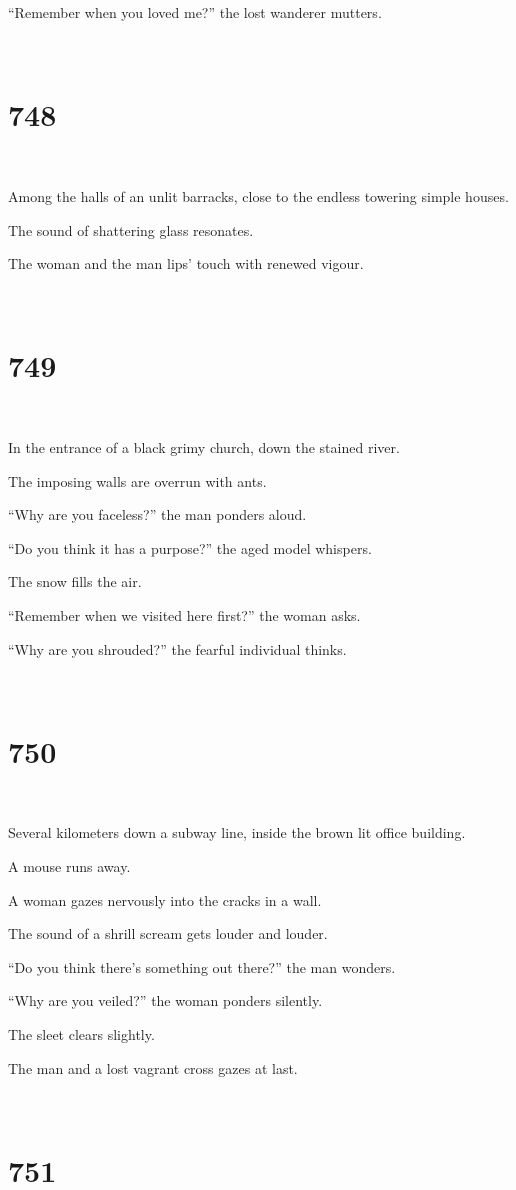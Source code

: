 \documentclass{report}
\begin{document}
``Remember when you loved me?'' the lost wanderer mutters.

~
\chapter*{748}
~

Among the halls of an unlit barracks, close to the endless towering simple houses.

The sound of shattering glass resonates.

The woman and the man lips' touch with renewed vigour.

~
\chapter*{749}
~

In the entrance of a black grimy church, down the stained river.

The imposing walls are overrun with ants.

``Why are you faceless?'' the man ponders aloud.

``Do you think it has a purpose?'' the aged model whispers.

The snow fills the air.

``Remember when we visited here first?'' the woman asks.

``Why are you shrouded?'' the fearful individual thinks.

~
\chapter*{750}
~

Several kilometers down a subway line, inside the brown lit office building.

A mouse runs away.

A woman gazes nervously into the cracks in a wall.

The sound of a shrill scream gets louder and louder.

``Do you think there's something out there?'' the man wonders.

``Why are you veiled?'' the woman ponders silently.

The sleet clears slightly.

The man and a lost vagrant cross gazes at last.

~
\chapter*{751}
~
\end{document}
